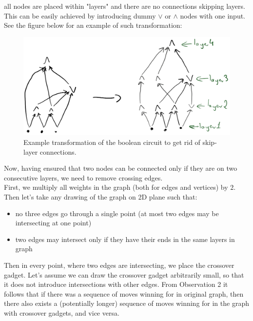 all nodes are placed within "layers" and there are no connections skipping layers. This can be easily
achieved by introducing dummy $\lor$ or $\land$ nodes with one input. See the figure below for an
example of such transformation:
\begin{figure}[H]
      \centering
      \caption{Example transformation of the boolean circuit to get rid of skip-layer connections.}
      \includegraphics[scale=0.2]{content/graphics/game19.png}
\end{figure}
\noindent
Now, having ensured that two nodes can be connected only if they are on two consecutive layers, 
we need to remove crossing edges.\\
First, we multiply all weights in the graph (both for edges and vertices) by $2$.\\
Then let's take any drawing of the graph on 2D plane such that:
\begin{itemize}
      \item no three edges go through a single point (at most two edges may be intersecting at one point)
      \item two edges may intersect only if they have their ends in the same layers in graph
\end{itemize}
Then in every point, where two edges are intersecting, we place the crossover gadget. Let's assume
we can draw the crossover gadget arbitrarily small, so that it does not introduce intersections with
other edges. From Observation 2 it follows that if there was a sequence of moves winning for in
original graph, then there also exists a (potentially longer) sequence of moves winning for in the
graph with crossover gadgets, and vice versa.
